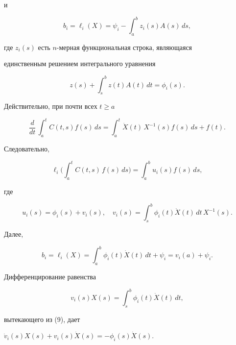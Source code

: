 и


\begin{equation}


b_i=\ell_i(X)=\psi_i-\int_a^b z_i(s)A(s)\,ds, %


\end{equation}


где $z_i(s)$ есть $n$-мерная функциональная строка, являющаяся


единственным решением интегрального уравнения


\begin{equation}


z(s)+\int_s^b z(t)A(t)\,dt=\phi_i(s). %


\end{equation}


Действительно, при почти всех $t\ge a$


$$


\frac{d}{dt}\,\int_a^t C(t,s)f(s)\,ds=\int_a^t\Dot X(t)\,


X^{-1}(s)f(s)\,ds+f(t).


$$


Следовательно,


\begin{equation}


\ell_i\bigg(\int_a^t C(t,s)\,f(s)\,ds\bigg)=\int_a^b u_i(s)f(s)\,ds, %


\end{equation}


где


\begin{equation}


u_i(s)=\phi_i(s)+v_i(s),\quad v_i(s)=\int_s^b


\phi_i(t)\Dot X(t)\,dt\,X^{-1}(s). %


\end{equation}


Далее,


\begin{equation}


b_i=\ell_i(X)=\int_a^b \phi_i(t)\Dot X(t)\,dt+\psi_i=v_i(a)+\psi_i. %


\end{equation}


Дифференцирование равенства


$$


v_i(s)X(s)=\int_s^b \phi_i(t)\Dot X(t)\,dt,


$$


вытекающего из (9), дает


$\Dot v_i(s)X(s)+v_i(s)\Dot X(s)=-\phi_i(s)\Dot X(s)$.


